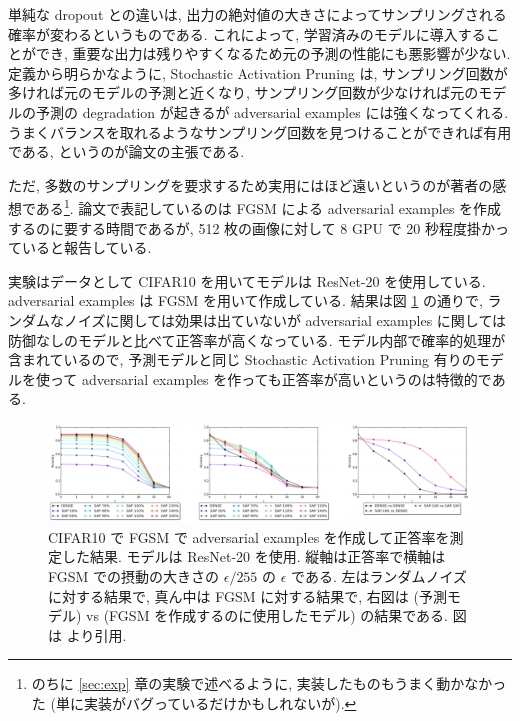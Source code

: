単純な dropout との違いは, 出力の絶対値の大きさによってサンプリングされる確率が変わるというものである.
これによって, 学習済みのモデルに導入することができ, 重要な出力は残りやすくなるため元の予測の性能にも悪影響が少ない.
定義から明らかなように, Stochastic Activation Pruning は, サンプリング回数が多ければ元のモデルの予測と近くなり, サンプリング回数が少なければ元のモデルの予測の degradation が起きるが adversarial examples には強くなってくれる.
うまくバランスを取れるようなサンプリング回数を見つけることができれば有用である, というのが論文の主張である.

ただ, 多数のサンプリングを要求するため実用にはほど遠いというのが著者の感想である\footnote{
のちに \ref{sec:exp} 章の実験で述べるように, 実装したものもうまく動かなかった (単に実装がバグっているだけかもしれないが).
}.
論文で表記しているのは FGSM による adversarial examples を作成するのに要する時間であるが, 512 枚の画像に対して 8 GPU で 20 秒程度掛かっていると報告している.

実験はデータとして CIFAR10 を用いてモデルは ResNet-20 を使用している.
adversarial examples は FGSM を用いて作成している.
結果は図 \ref{fig:adversarial-examples-result-table} の通りで, ランダムなノイズに関しては効果は出ていないが adversarial examples に関しては防御なしのモデルと比べて正答率が高くなっている.
モデル内部で確率的処理が含まれているので, 予測モデルと同じ Stochastic Activation Pruning 有りのモデルを使って adversarial examples を作っても正答率が高いというのは特徴的である.
%
\begin{figure}[htbp]
\begin{center}
\includegraphics[width=16.0cm]{figures/adversarial-examples-result-table.pdf}
\end{center}
\caption{
CIFAR10 で FGSM で adversarial examples を作成して正答率を測定した結果.
モデルは ResNet-20 を使用.
縦軸は正答率で横軸は FGSM での摂動の大きさの $\epsilon / 255$ の $\epsilon$ である.
左はランダムノイズに対する結果で, 真ん中は FGSM に対する結果で, 右図は (予測モデル) vs (FGSM を作成するのに使用したモデル) の結果である.
図は \cite{dhillon2018stochastic} より引用.
}
\label{fig:adversarial-examples-result-table}
\end{figure}
%

